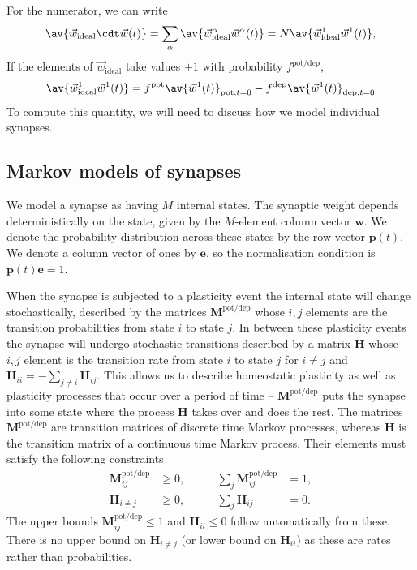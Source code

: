 \documentclass[12pt]{article}
\newcommand{\onev}{\mathbf{e}}
\newcommand{\pr}{\mathbf{p}}
\newcommand{\w}{\mathbf{w}}
\newcommand{\M}{\mathbf{M}}
\newcommand{\pot}{^{\text{pot}}}
\newcommand{\dep}{^{\text{dep}}}
\newcommand{\potdep}{^{\text{pot/dep}}}
\renewcommand{\hom}{\mathbf{H}}
\newcommand{\syn}{\vec{w}}
\newcommand{\synid}{\syn_\text{ideal}}
\begin{document}
For the numerator, we can write
%
\begin{equation}\label{eq:overlapex}
  \av{\syn_\text{ideal}\cdt\syn(t)} = \sum_\alpha\av{\syn^\alpha_\text{ideal}\syn^\alpha(t)}
   = N \av{\syn^1_\text{ideal}\syn^1(t)},
\end{equation}
%
If the elements of $\synid$ take values $\pm1$ with probability $f\potdep$,
%
\begin{equation}\label{eq:overlapone}
  \av{\syn^1_\text{ideal}\syn^1(t)} = f\pot \av{\syn^1(t)}_{\text{pot},t=0} - f\dep \av{\syn^1(t)}_{\text{dep},t=0}
\end{equation}
%
To compute this quantity, we will need to discuss how we model individual synapses.




\subsection{Markov models of synapses}\label{sec:markovsynapse}

We model a synapse as having $M$ internal states.
The synaptic weight depends deterministically on the state, given by the $M$-element column vector $\w$.
We denote the probability distribution across these states by the row vector $\pr(t)$.
We denote a column vector of ones by $\onev$, so the normalisation condition is $\pr(t)\onev=1$.

When the synapse is subjected to a plasticity event the internal state will change stochastically, described by the matrices $\M\potdep$ whose $i,j$ elements are the transition probabilities from state $i$ to state $j$.
In between these plasticity events the synapse will undergo stochastic transitions described by a matrix $\hom$ whose $i,j$ element is the transition rate from state $i$ to state $j$ for $i \neq j$ and $\hom_{ii}=-\sum_{j \neq i} \hom_{ij}$.
This allows us to describe homeostatic plasticity as well as plasticity processes that occur over a period of time -- $\M\potdep$ puts the synapse into some state where the process $\hom$ takes over and does the rest.
The matrices $\M\potdep$ are transition matrices of discrete time Markov processes, whereas $\hom$ is the transition matrix of a continuous time Markov process.
Their elements must satisfy the following constraints
%
\begin{equation}\label{eq:constr}
\begin{aligned}
  \M\potdep_{ij} &\geq 0, &\qquad
  \sum_j \M\potdep_{ij} &= 1, \\
  \hom_{i \neq j} &\geq 0, &\qquad
  \sum_j \hom_{ij} &= 0.
\end{aligned}
\end{equation}
%
The upper bounds $\M\potdep_{ij} \leq 1$ and $\hom_{ii} \leq 0$ follow automatically from these.
There is no upper bound on $\hom_{i \neq j}$ (or lower bound on $\hom_{ii}$) as these are rates rather than probabilities.
\end{document}
